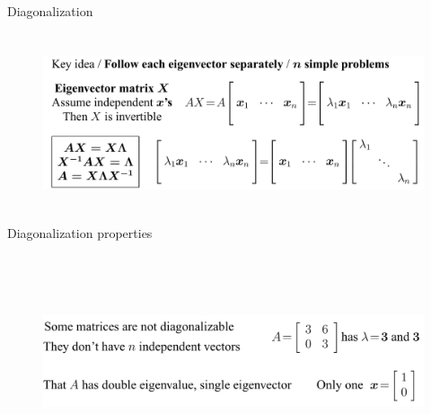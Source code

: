 \documentclass[aspectratio=169]{beamer}
\begin{document}
\begin{frame}[t]{Diagonalization}
\framesubtitle{}
    \begin{figure}[H]
        \centering\includegraphics[height=5cm,width=1\textwidth,keepaspectratio]{Diag.png}
        \label{fig:Diag.png}
    \end{figure}
\end{frame}

\begin{frame}[t]{Diagonalization properties}
\framesubtitle{}
    \begin{figure}[H]
        \centering\includegraphics[height=6cm,width=1\textwidth,keepaspectratio]{Diag_properties.png}
        \label{fig:Diag_properties.png}
    \end{figure}
\end{frame}
\end{document}
